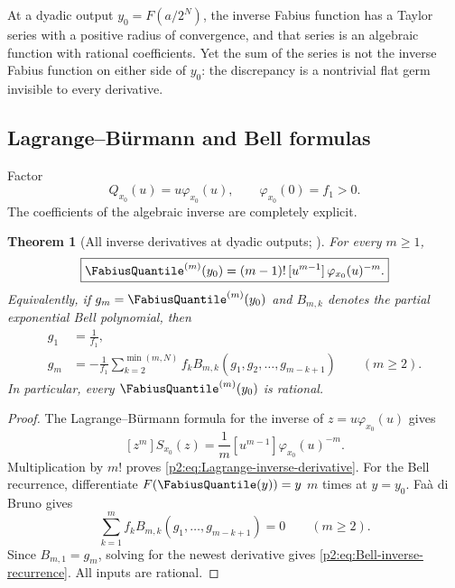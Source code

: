 \documentclass[11pt,oneside]{article}
\numberwithin{equation}{section}
\newtheorem{theorem}{Theorem}[section]
\theoremstyle{definition}
\theoremstyle{remark}
\begin{document}
\begin{resultbox}
At a dyadic output $y_0=F(a/2^N)$, the inverse Fabius function has a Taylor series with a positive
radius of convergence, and that series is an algebraic function with rational coefficients.  Yet the
sum of the series is not the inverse Fabius function on either side of $y_0$: the discrepancy is a
nontrivial flat germ invisible to every derivative.
\end{resultbox}

\subsection{Lagrange--B\"urmann and Bell formulas}

Factor
\begin{equation}
 Q_{x_0}(u)=u\varphi_{x_0}(u),
 \qquad
 \varphi_{x_0}(0)=f_1>0.
 \label{p2:eq:Q-phi}
\end{equation}
The coefficients of the algebraic inverse are completely explicit.

\begin{theorem}[All inverse derivatives at dyadic outputs; \statusnew]
\label{p2:thm:inverse-derivatives}
For every $m\ge1$,
\begin{equation}
 \boxed{
 \FabiusQuantile^{(m)}(y_0)
 =(m-1)!\,[u^{m-1}]\,\varphi_{x_0}(u)^{-m}.
 }
 \label{p2:eq:Lagrange-inverse-derivative}
\end{equation}
Equivalently, if $g_m=\FabiusQuantile^{(m)}(y_0)$ and $B_{m,k}$ denotes the partial exponential Bell
polynomial, then
\begin{align}
 g_1&=\frac1{f_1},
 \label{p2:eq:g1}\\
 g_m&=-\frac1{f_1}
 \sum_{k=2}^{\min(m,N)}f_k
 B_{m,k}(g_1,g_2,\ldots,g_{m-k+1})
 \qquad(m\ge2).
 \label{p2:eq:Bell-inverse-recurrence}
\end{align}
In particular, every $\FabiusQuantile^{(m)}(y_0)$ is rational.
\end{theorem}

\begin{proof}
The Lagrange--B\"urmann formula for the inverse of $z=u\varphi_{x_0}(u)$ gives
\[
 [z^m]S_{x_0}(z)=\frac1m[u^{m-1}]\varphi_{x_0}(u)^{-m}.
\]
Multiplication by $m!$ proves \eqref{p2:eq:Lagrange-inverse-derivative}.  For the Bell recurrence,
differentiate $F(\FabiusQuantile(y))=y$ $m$ times at $y=y_0$.  Fa\`a di Bruno gives
\[
 \sum_{k=1}^{m} f_k B_{m,k}(g_1,\ldots,g_{m-k+1})=0\qquad(m\ge2).
\]
Since $B_{m,1}=g_m$, solving for the newest derivative gives
\eqref{p2:eq:Bell-inverse-recurrence}.  All inputs are rational.
\end{proof}
\end{document}
